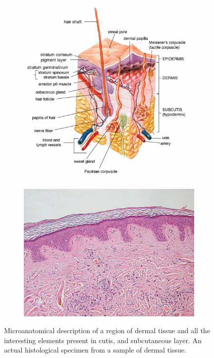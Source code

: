     \begin{figure}
        \centering
        \begin{subfigure}[b]{0.45\textwidth}
             \centering
             \includegraphics[width = \textwidth]{images/derm_scheme}
             \caption{}
             \label{fig:derm_scheme}
        \end{subfigure}
        \hfill
        \begin{subfigure}[b]{0.45\textwidth}
             \centering
             \includegraphics[width = \textwidth]{images/derm_specimen}
             \caption{}
             \label{fig:derm_specimen}
        \end{subfigure}
        \caption{Microanatomical description of a region of dermal tissue and all the interesting elements present in cutis, and subcutaneous layer. An actual histological specimen from a sample of dermal tissue.}
        \label{fig:derm_descr}
    \end{figure}

